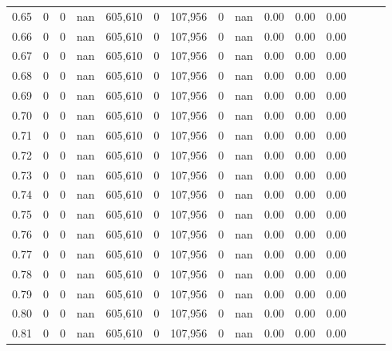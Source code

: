 \begin{tabular}{rrrrrrrrrrrrrrr}
0.65 &        0 &       0 &   nan &  605,610 &        0 &  107,956 &        0 &   nan &  0.00 &  0.00 &      0.00 \\
0.66 &        0 &       0 &   nan &  605,610 &        0 &  107,956 &        0 &   nan &  0.00 &  0.00 &      0.00 \\
0.67 &        0 &       0 &   nan &  605,610 &        0 &  107,956 &        0 &   nan &  0.00 &  0.00 &      0.00 \\
0.68 &        0 &       0 &   nan &  605,610 &        0 &  107,956 &        0 &   nan &  0.00 &  0.00 &      0.00 \\
0.69 &        0 &       0 &   nan &  605,610 &        0 &  107,956 &        0 &   nan &  0.00 &  0.00 &      0.00 \\
0.70 &        0 &       0 &   nan &  605,610 &        0 &  107,956 &        0 &   nan &  0.00 &  0.00 &      0.00 \\
0.71 &        0 &       0 &   nan &  605,610 &        0 &  107,956 &        0 &   nan &  0.00 &  0.00 &      0.00 \\
0.72 &        0 &       0 &   nan &  605,610 &        0 &  107,956 &        0 &   nan &  0.00 &  0.00 &      0.00 \\
0.73 &        0 &       0 &   nan &  605,610 &        0 &  107,956 &        0 &   nan &  0.00 &  0.00 &      0.00 \\
0.74 &        0 &       0 &   nan &  605,610 &        0 &  107,956 &        0 &   nan &  0.00 &  0.00 &      0.00 \\
0.75 &        0 &       0 &   nan &  605,610 &        0 &  107,956 &        0 &   nan &  0.00 &  0.00 &      0.00 \\
0.76 &        0 &       0 &   nan &  605,610 &        0 &  107,956 &        0 &   nan &  0.00 &  0.00 &      0.00 \\
0.77 &        0 &       0 &   nan &  605,610 &        0 &  107,956 &        0 &   nan &  0.00 &  0.00 &      0.00 \\
0.78 &        0 &       0 &   nan &  605,610 &        0 &  107,956 &        0 &   nan &  0.00 &  0.00 &      0.00 \\
0.79 &        0 &       0 &   nan &  605,610 &        0 &  107,956 &        0 &   nan &  0.00 &  0.00 &      0.00 \\
0.80 &        0 &       0 &   nan &  605,610 &        0 &  107,956 &        0 &   nan &  0.00 &  0.00 &      0.00 \\
0.81 &        0 &       0 &   nan &  605,610 &        0 &  107,956 &        0 &   nan &  0.00 &  0.00 &      0.00 \\

\end{tabular}
